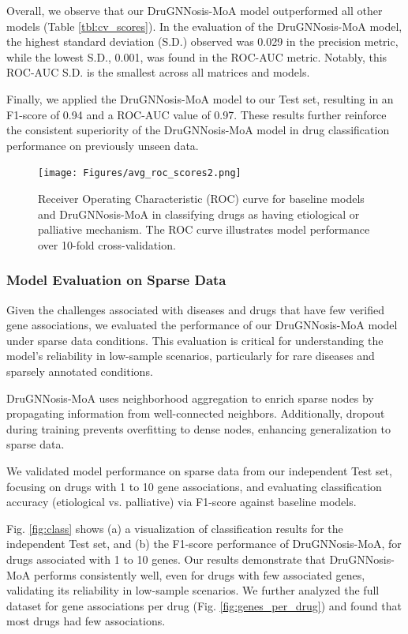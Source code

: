 \documentclass[journal,twoside,web]{ieeecolor}
\begin{document}
Overall, we observe that our DruGNNosis-MoA model outperformed all other models (Table \ref{tbl:cv_scores}).
In the evaluation of the DruGNNosis-MoA model, the highest standard deviation (S.D.) observed was 0.029 in the precision metric, while the lowest S.D., 0.001, was found in the ROC-AUC metric.
Notably, this ROC-AUC S.D. is the smallest across all matrices and models.

Finally, we applied the DruGNNosis-MoA model to our Test set,
resulting in an F1-score of 0.94 and a ROC-AUC value of 0.97.
These results further reinforce the consistent superiority of the DruGNNosis-MoA model in drug classification performance on previously unseen data.


\begin{figure}
\centering
   \texttt{[image: Figures/avg\_roc\_scores2.png]}
   \caption{
    Receiver Operating Characteristic (ROC) curve for baseline models and DruGNNosis-MoA in classifying drugs as having etiological or palliative mechanism. 
    The ROC curve illustrates model performance over 10-fold cross-validation.}
\label{fig:roc_auc1}
\end{figure}



\subsubsection{Model Evaluation on Sparse Data}
\label{sec:sparse_data_evaluation}

Given the challenges associated with diseases and drugs that have few verified gene associations, we evaluated the performance of our DruGNNosis-MoA model under sparse data conditions.
This evaluation is critical for understanding the model's reliability in low-sample scenarios, particularly for rare diseases and sparsely annotated conditions.

DruGNNosis-MoA uses neighborhood aggregation to enrich sparse nodes by propagating information from well-connected neighbors.
Additionally, dropout during training prevents overfitting to dense nodes, enhancing generalization to sparse data.

We validated model performance on sparse data from our independent Test set, focusing on drugs with 1 to 10 gene associations, and evaluating classification accuracy (etiological vs. palliative) via F1-score against baseline models.

Fig. \ref{fig:class} shows (a) a visualization of classification results for the independent Test set, and (b) the F1-score performance of DruGNNosis-MoA, for drugs associated with 1 to 10 genes. 
Our results demonstrate that DruGNNosis-MoA performs consistently well, even for drugs with few associated genes, validating its reliability in low-sample scenarios.
We further analyzed the full dataset for gene associations per drug (Fig. \ref{fig:genes_per_drug}) and found that most drugs had few associations. 
\end{document}
